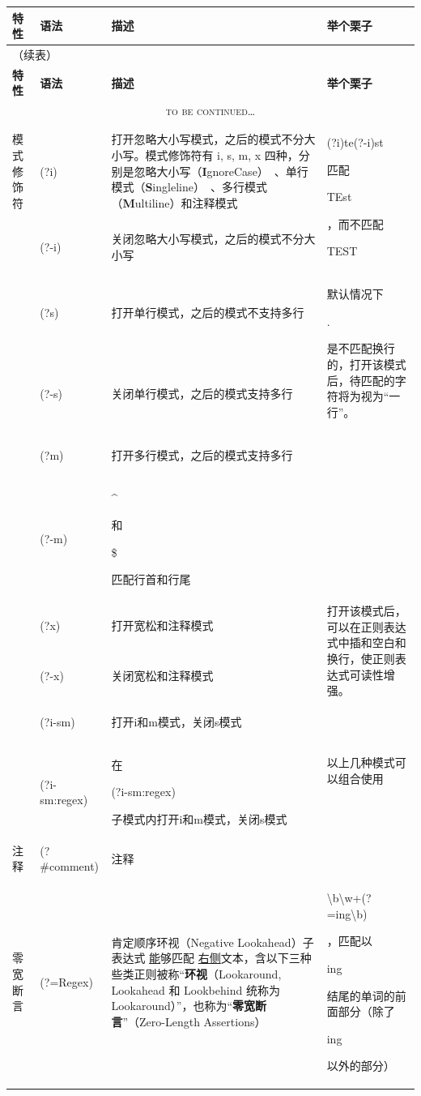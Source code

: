 \documentclass[12pt,a4paper,twoside]{ctexart}
\newcommand{\cbregex}[1]{\colorbox{orange!18}{\strut #1}}
\newcommand{\cbmatch}[1]{\colorbox{cyan!35}{\strut #1}}
\newcommand{\cbstring}[1]{\colorbox{green!20}{\strut #1}}
\begin{document}
\begin{center}

\begin{longtable}{p{4em}p{9em}p{25em}p{18em}}
  \toprule
  \textbf{特性} & \textbf{语法} & \textbf{描述} & \textbf{举个栗子} \\
  \midrule
  \endfirsthead                 %
  \multicolumn{4}{l}{（续表）} \\
  \toprule
  \textbf{特性} & \textbf{语法} & \textbf{描述} & \textbf{举个栗子} \\
  \midrule
  \endhead                      %
  \multicolumn{4}{c}{\textsc{to be continued}\ldots} \\[2ex]
  \endfoot                      %
  \bottomrule
  \endlastfoot                  %
  模式\newline{}修饰符 & \cbregex{(?i)} & 打开忽略大小写模式，之后的模式不分大小写。模式修饰符有 i, s, m, x 四种，分别是忽略大小写（\textbf{I}gnoreCase）~、单行模式（\textbf{S}ingleline）~、多行模式（\textbf{M}ultiline）和注释模式 & \multirow{2}{18em}{\cbregex{(?i)te(?-i)st} 匹配 \cbmatch{TEst}，而不匹配 \cbstring{TEST}} \\
  & \cbregex{(?-i)} & 关闭忽略大小写模式，之后的模式不分大小写 & \\
  & \cbregex{(?s)} & 打开单行模式，之后的模式不支持多行 & \multirow{2}{18em}{默认情况下\cbregex{.}是不匹配换行的，打开该模式后，待匹配的字符将为视为“一行”。} \\
  & \cbregex{(?-s)} & 关闭单行模式，之后的模式支持多行 & \\
  & \cbregex{(?m)} & 打开多行模式，之后的模式支持多行 & \\
  & \cbregex{(?-m)} & \cbregex{\^{}} 和 \cbregex{\$} 匹配行首和行尾 & \\
  & \cbregex{(?x)} & 打开宽松和注释模式 & \multirow{2}{18em}{打开该模式后，可以在正则表达式中插和空白和换行，使正则表达式可读性增强。} \\
  & \cbregex{(?-x)} & 关闭宽松和注释模式 & \\
  & \cbregex{(?i-sm)} & 打开i和m模式，关闭s模式 & \multirow{2}{18em}{以上几种模式可以组合使用} \\
  & \cbregex{(?i-sm:regex)} & 在\cbregex{(?i-sm:regex)} 子模式内打开i和m模式，关闭s模式 & \\
  \midrule
  注释 & (?\#comment) & 注释 & \\
  \midrule
  零宽断言 & (?=Regex) & 肯定顺序环视（Negative Lookahead）\newline{}子表达式 \underline{能}够匹配 \underline{右侧}文本，含以下三种些类正则被称“\textbf{环视}（Lookaround, Lookahead 和 Lookbehind 统称为 Lookaround）”，也称为“\textbf{零宽断言}”（Zero-Length Assertions） & \cbregex{\textbackslash{}b\textbackslash{}w+(?=ing\textbackslash{}b)}，匹配以\cbstring{ing}结尾的单词的前面部分（除了\cbstring{ing}以外的部分） \\

\end{longtable}
\end{center}
\end{document}
